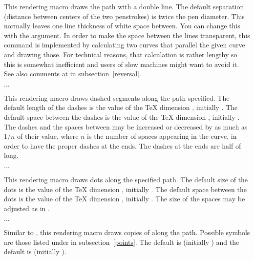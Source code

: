 \documentclass[letterpaper]{article}
\begin{document}
This rendering macro draws the path with a double line. The default
separation (distance between centers of the two penstrokes) is twice the
pen diameter. This normally leaves one line thickness of white space
between. You can change this with the  argument. In
order to make the space between the lines transparent, this command is
implemented by calculating two curves that parallel the given curve and
drawing those. For technical reasons, that calculation is rather lengthy
so this is somewhat inefficient and users of slow machines might want to
avoid it. See also comments at  in
subsection~\ref{reversal}.

\begin{cd}
$\ldots$%
\end{cd}

This rendering macro draws dashed segments along the path specified.
The default length of the dashes is the value of the \TeX{} dimension
, initially \dim{4pt}. The default space between the dashes
is the value of the \TeX{} dimension , initially
\dim{4pt}. The dashes and the spaces between may be increased or
decreased by as much as $1/n$ of their value, where $n$ is the number of
spaces appearing in the curve, in order to have the proper dashes at the
ends. The dashes at the ends are half of  long.

\begin{cd}
$\ldots$%
\end{cd}

This rendering macro draws dots along the specified path. The default
size of the dots is the value of the \TeX{} dimension ,
initially \dim{0.5pt}. The default space between the dots is the value
of the \TeX{} dimension , initially \dim{3pt}. The size of
the spaces may be adjusted as in .

\begin{cd}
$\ldots$%
\end{cd}

Similar to , this rendering macro draws copies of
 along the path. Possible symbols are those listed under
 in subsection~\ref{points}. The default  is
 (initially \dim{2pt}) and the default  is
 (initially \dim{5pt}).
\end{document}
